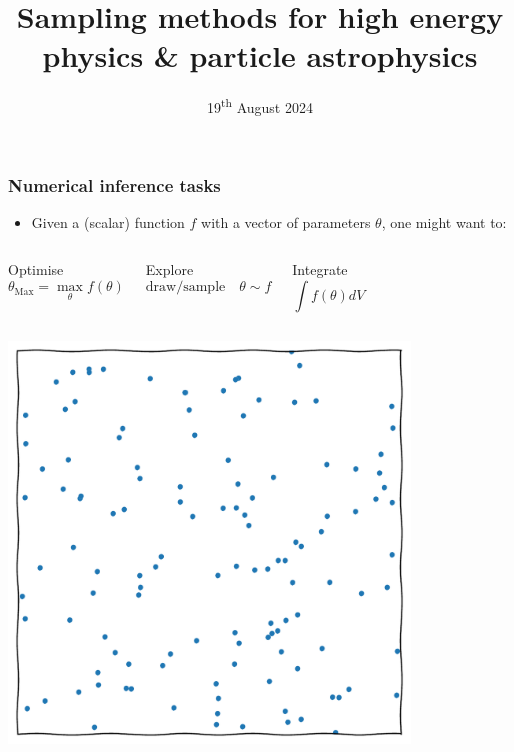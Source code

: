 \documentclass[aspectratio=169,handout]{beamer}
\title{Sampling methods for high energy physics \& particle astrophysics}
\date{19\textsuperscript{th} August 2024}
\begin{document}
\begin{frame}
    \titlepage
\end{frame}

%

\begin{frame}
    \frametitle{Numerical inference tasks}
    \begin{itemize}
        \item Given a (scalar) function $f$ with a vector of parameters $\theta$, one might want to:
    \end{itemize}
    \vspace{-10pt}
    \begin{columns}[t]
        \begin{block}{Optimise}
            \[\theta_\text{Max} = \max_\theta{f(\theta)}\]
        \end{block}
        \begin{block}{Explore}
            \vspace{-10pt}
            \[\text{draw/sample}\quad \theta\sim f\]
            \vspace{-15pt}
        \end{block}
        \begin{block}{Integrate}
            \[\int f(\theta) dV \]
        \end{block}
    \end{columns}
    \begin{columns}[t]
        \centerline{\includegraphics[width=0.8\textwidth,page=13]{figures/himmelblau}}

\end{columns}
\end{frame}
\end{document}
